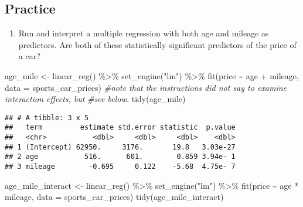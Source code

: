 \documentclass[
]{article}
\newenvironment{Shaded}{\begin{snugshade}}{\end{snugshade}}
\newcommand{\AttributeTok}[1]{\textcolor[rgb]{0.77,0.63,0.00}{#1}}
\newcommand{\CommentTok}[1]{\textcolor[rgb]{0.56,0.35,0.01}{\textit{#1}}}
\newcommand{\FunctionTok}[1]{\textcolor[rgb]{0.00,0.00,0.00}{#1}}
\newcommand{\NormalTok}[1]{#1}
\newcommand{\OtherTok}[1]{\textcolor[rgb]{0.56,0.35,0.01}{#1}}
\newcommand{\SpecialCharTok}[1]{\textcolor[rgb]{0.00,0.00,0.00}{#1}}
\newcommand{\StringTok}[1]{\textcolor[rgb]{0.31,0.60,0.02}{#1}}
\providecommand{\tightlist}{%
  \setlength{\itemsep}{0pt}\setlength{\parskip}{0pt}}
\begin{document}
\hypertarget{practice}{%
\subsection{Practice}\label{practice}}

\begin{enumerate}
\def\labelenumi{\arabic{enumi}.}
\tightlist
\item
  Run and interpret a multiple regression with both age and mileage as
  predictors. Are both of these statistically significant predictors of
  the price of a car?
\end{enumerate}

\begin{Shaded}
\begin{Highlighting}[]
\NormalTok{age\_mile }\OtherTok{\textless{}{-}} \FunctionTok{linear\_reg}\NormalTok{() }\SpecialCharTok{\%\textgreater{}\%} 
  \FunctionTok{set\_engine}\NormalTok{(}\StringTok{"lm"}\NormalTok{) }\SpecialCharTok{\%\textgreater{}\%} 
  \FunctionTok{fit}\NormalTok{(price }\SpecialCharTok{\textasciitilde{}}\NormalTok{ age }\SpecialCharTok{+}\NormalTok{ mileage, }\AttributeTok{data =}\NormalTok{ sports\_car\_prices)}
\CommentTok{\#note that the instructions did not say to examine interaction effects, but }
\CommentTok{\#see below.}
\FunctionTok{tidy}\NormalTok{(age\_mile)}
\end{Highlighting}
\end{Shaded}

\begin{verbatim}
## # A tibble: 3 x 5
##   term         estimate std.error statistic  p.value
##   <chr>           <dbl>     <dbl>     <dbl>    <dbl>
## 1 (Intercept) 62950.     3176.       19.8   3.03e-27
## 2 age           516.      601.        0.859 3.94e- 1
## 3 mileage        -0.695     0.122    -5.68  4.75e- 7
\end{verbatim}

\begin{Shaded}
\begin{Highlighting}[]
\NormalTok{age\_mile\_interact }\OtherTok{\textless{}{-}} \FunctionTok{linear\_reg}\NormalTok{() }\SpecialCharTok{\%\textgreater{}\%} 
  \FunctionTok{set\_engine}\NormalTok{(}\StringTok{"lm"}\NormalTok{) }\SpecialCharTok{\%\textgreater{}\%} 
  \FunctionTok{fit}\NormalTok{(price }\SpecialCharTok{\textasciitilde{}}\NormalTok{ age }\SpecialCharTok{*}\NormalTok{ mileage, }\AttributeTok{data =}\NormalTok{ sports\_car\_prices)}
\FunctionTok{tidy}\NormalTok{(age\_mile\_interact)}
\end{Highlighting}
\end{Shaded}
\end{document}
